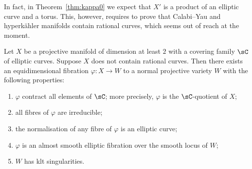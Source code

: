 \begin{rema}\label{rema:main6.11} 
In fact, in Theorem~\ref{thm:kappa0} we expect that $X'$ is a product of an elliptic curve and a torus. This, however, requires to prove that Calabi--Yau and hyperkähler manifolds contain rational curves, which seems out of reach at the moment.
\end{rema}


\begin{theo}\label{thm:ratcurves}
Let $X$ be a projective manifold of dimension at least $2$ with a covering family $\sC$ of elliptic curves. Suppose $X$ does not contain rational curves. Then there exists an equidimensional fibration $\varphi\colon X \to W$ to a normal projective variety $W$ with the following properties:
\begin{enumerate}\romanenumi
\item \label{list-6.12.1}$\varphi$ contract all elements of $\sC$; more precisely, $\varphi$ is the $\sC$-quotient of $X$;
\item \label{list-6.12.2}all fibres of $\varphi$ are irreducible;
\item \label{list-6.12.3}the normalisation of any fibre of $\varphi$ is an elliptic curve;
\item \label{list-6.12.4}$\varphi$ is an almost smooth elliptic fibration over the smooth locus of $W$;
\item \label{list-6.12.5}$W$ has klt singularities.
\end{enumerate}
\end{theo}

